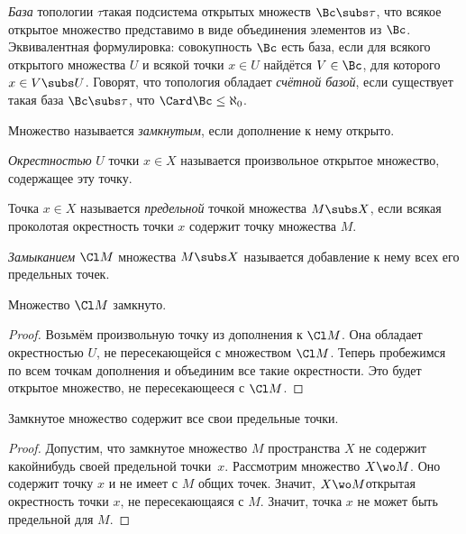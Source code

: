 \documentclass[a4paper]{article}
\begin{document}
\begin{df}
\emph{База} топологии $\tau$\т такая подсистема
открытых множеств $\Bc \subs \tau$, что всякое открытое множество представимо в виде объединения
элементов из $\Bc$. Эквивалентная формулировка: совокупность $\Bc$ есть база, если
для всякого открытого множества $U$ и всякой точки $x \in U$ найдётся $V \in \Bc$, для которого
$x \in V \subs U$. Говорят, что топология обладает \emph{счётной базой}, если существует такая база $\Bc \subs \tau$,
что $\Card \Bc \le \aleph_0$.
\end{df}

\begin{df}
Множество называется \emph{замкнутым}, если дополнение к нему открыто.
\end{df}

\begin{df}
\emph{Окрестностью} $U$ точки $x \in X$ называется произвольное открытое множество,
содержащее эту точку.
\end{df}


\begin{df}
Точка $x \in X$ называется \emph{предельной} точкой множества $M \subs X$,
если всякая проколотая окрестность точки $x$ содержит точку множества $M$.
\end{df}

\begin{df}
\emph{Замыканием} $\Cl M$ множества $M \subs X$ называется добавление к нему всех его предельных точек.
\end{df}

\begin{stm}
Множество $\Cl M$ замкнуто.
\end{stm}
\begin{proof}
Возьмём произвольную точку из дополнения к $\Cl M$. Она обладает окрестностью $U$, не пересекающейся
с множеством $\Cl M$. Теперь пробежимся по всем точкам дополнения и объединим все такие
окрестности. Это будет открытое множество, не пересекающееся с $\Cl M$.
\end{proof}

\begin{stm}
Замкнутое множество содержит все свои предельные точки.
\end{stm}
\begin{proof}
Допустим, что замкнутое множество $M$ пространства $X$ не содержит какой\д нибудь
своей предельной точки~$x$. Рассмотрим множество $X \wo M$. Оно содержит точку $x$
и не имеет с $M$ общих точек. Значит, $X\wo M$\т открытая окрестность точки $x$,
не пересекающаяся с $M$. Значит, точка $x$ не может быть предельной для $M$.
\end{proof}
\end{document}
